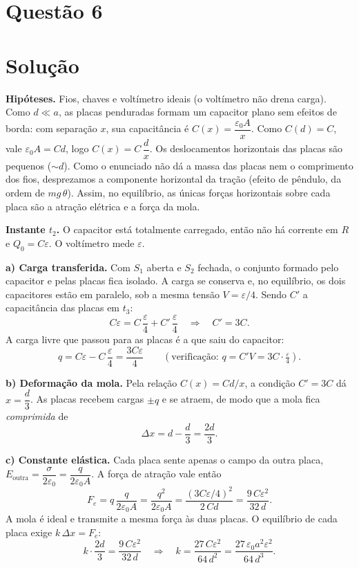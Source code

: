 \documentclass{article}%
\begin{document}
\section*{Questão 6}

\section*{Solução}

\textbf{Hipóteses.} Fios, chaves e voltímetro ideais (o voltímetro não drena carga). Como $d\ll a$, as placas penduradas formam um capacitor plano sem efeitos de borda: com separação $x$, sua capacitância é $C(x)=\dfrac{\varepsilon_0 A}{x}$. Como $C(d)=C$, vale $\varepsilon_0 A = Cd$, logo $C(x)=C\,\dfrac{d}{x}$. Os deslocamentos horizontais das placas são pequenos ($\sim d$). Como o enunciado não dá a massa das placas nem o comprimento dos fios, desprezamos a componente horizontal da tração (efeito de pêndulo, da ordem de $mg\,\theta$). Assim, no equilíbrio, as únicas forças horizontais sobre cada placa são a atração elétrica e a força da mola.

\textbf{Instante $t_2$.} O capacitor está totalmente carregado, então não há corrente em $R$ e $Q_0=C\varepsilon$. O voltímetro mede $\varepsilon$.

\textbf{a) Carga transferida.} Com $S_1$ aberta e $S_2$ fechada, o conjunto formado pelo capacitor e pelas placas fica isolado. A carga se conserva e, no equilíbrio, os dois capacitores estão em paralelo, sob a mesma tensão $V=\varepsilon/4$. Sendo $C'$ a capacitância das placas em $t_3$:
\[
C\varepsilon = C\,\frac{\varepsilon}{4} + C'\,\frac{\varepsilon}{4}\quad\Longrightarrow\quad C' = 3C .
\]
A carga livre que passou para as placas é a que saiu do capacitor:
\[
q = C\varepsilon - C\,\frac{\varepsilon}{4} = \frac{3C\varepsilon}{4}\qquad\left(\text{verificação: } q=C'V=3C\cdot\tfrac{\varepsilon}{4}\right).
\]

\textbf{b) Deformação da mola.} Pela relação $C(x)=Cd/x$, a condição $C'=3C$ dá $x=\dfrac{d}{3}$. As placas recebem cargas $\pm q$ e se atraem, de modo que a mola fica \emph{comprimida} de
\[
\Delta x = d-\frac{d}{3} = \frac{2d}{3}.
\]

\textbf{c) Constante elástica.} Cada placa sente apenas o campo da outra placa, $E_{\text{outra}}=\dfrac{\sigma}{2\varepsilon_0}=\dfrac{q}{2\varepsilon_0 A}$. A força de atração vale então
\[
F_e = q\,\frac{q}{2\varepsilon_0 A} = \frac{q^2}{2\varepsilon_0 A} = \frac{(3C\varepsilon/4)^2}{2\,C d} = \frac{9\,C\varepsilon^2}{32\,d}.
\]
A mola é ideal e transmite a mesma força às duas placas. O equilíbrio de cada placa exige $k\,\Delta x = F_e$:
\[
k\cdot\frac{2d}{3} = \frac{9\,C\varepsilon^2}{32\,d}
\quad\Longrightarrow\quad
k = \frac{27\,C\varepsilon^2}{64\,d^2} = \frac{27\,\varepsilon_0 a^2\varepsilon^2}{64\,d^3}.
\]
\end{document}
